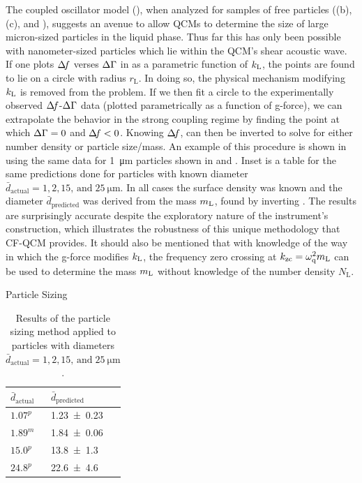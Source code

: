 The coupled oscillator model (), when analyzed for
samples of free particles ((b),
(c), and ), suggests an avenue
to allow QCMs to determine the size of large micron-sized particles in the
liquid phase.  Thus far this has only been possible with nanometer-sized
particles which lie within the QCM's shear acoustic
wave.~\cite{olsson2013using}  If one plots $\Delta\!f$ verses $\Delta\Gamma$ in
 as a parametric function of $k_\mathrm{L}$, the points are
found to lie on a circle with radius $r_\mathrm{L}$.  In doing so, the physical
mechanism modifying $k_\mathrm{L}$ is removed from the problem.
If we then fit a
circle to the experimentally observed $\Delta\!f$-$\Delta\Gamma$ data (plotted
parametrically as a function of g-force), we can extrapolate the behavior
in the strong coupling regime by finding the point at which $\Delta\Gamma=0$ and
$\Delta\!f<0$.  Knowing $\Delta\!f$,  can then be inverted to
solve for either number density or particle size/mass.  An example of this
procedure is shown in  using the same data for
\SI{1}{\micro\meter} particles shown in
 and .  Inset is a table for the same
predictions done for particles with known diameter
$\bar{d}_\mathrm{actual}=1, 2, 15,\,\mathrm{and}\;\SI{25}{\micro\meter}$.
In all cases the surface density was known and the diameter
$\bar{d}_\text{predicted}$ was derived from the mass $m_\mathrm{L}$, found by
inverting .  The results are surprisingly accurate
despite the exploratory nature of the instrument's construction, which
illustrates the robustness of this unique methodology that CF-QCM
provides.
It should also be mentioned that with knowledge of the way in which the
g-force modifies $k_\mathrm{L}$, the frequency zero crossing at
$k_\mathrm{zc}=\omega_\mathrm{q}^2m_\mathrm{L}$ can be used to determine the mass $m_\mathrm{L}$
without knowledge of the number density $N_\mathrm{L}$. 
\begin{table}[ht]
\centering
Particle Sizing\\
 \begin{tabularx}{80pt}{XX}
 \toprule
 $\bar{d}_\mathrm{actual}$ & $\bar{d}_\mathrm{predicted}$ \\
 \midrule
  $1.07^p$ & \num{1.23+-0.23} \\
  $1.89^m$ & \num{1.84+-0.06} \\
  $15.0^p$ & \num{13.8+-1.3} \\
  $24.8^p$ & \num{22.6+-4.6} \\
 \bottomrule
\end{tabularx}
\caption{Results of the particle sizing method applied to particles with diameters
$\bar{d}_\mathrm{actual}=1, 2, 15,\,\mathrm{and}\;\SI{25}{\micro\meter}$.}
\label{tbl:particlesizing}
\end{table}

